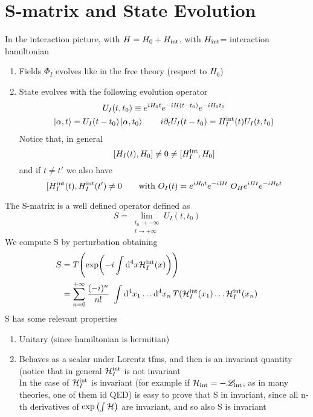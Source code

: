 \section{S-matrix and State Evolution}
In the interaction picture, with $H = H_0 + H_{\textup{int}}$, with $H_{\textup{int}}$= interaction hamiltonian\\
\begin{enumerate}
\item{Fields }$\Phi_I$ evolves like in the free theory (respect to $H_0$)
\item{State evolves with the following evolution operator}
	\begin{gather}
	U_I(t, t_0) \equiv e^{iH_0t} e^{-iH(t-t_0)} e^{-iH_0t_0} \notag \\
	\Ket{\alpha, t} = U_I (t - t_0) \Ket{\alpha, t_0}
	\qquad
	i \partial_t U_I (t-t_0) = H_I^{\textup{int}}(t) U_I(t, t_0) \notag
	\end{gather}
	Notice that, in general
	\[
	[H_I(t), H_0] \ne 0 \ne [H_I^{\textup{int}}, H_0]
	\]
	and if $t \ne t'$ we also have
	\[
	[H_I^{\textup{int}}(t), H_I^{\textup{int}}(t') \ne 0
	\qquad
	\text{with } O_I(t) = e^{iH_0t}e^{-iHt} \ O_H e^{iHt} e^{-iH_0t}
	\]
\end{enumerate}
The S-matrix is a well defined operator defined as
\[
S = \lim_{\substack{t_0 \to -\infty \\ t \to +\infty}} U_I(t, t_0)
\]
We compute S by perturbation obtaining
\[
\begin{split}
S 	& = T \Biggl( \exp \biggl( -i \int \textup{d}^4 x \mathcal{H}_I^{\textup{int}}(x) \biggr) \Biggr) \\
	& = \sum_{n=0}^{+\infty} \frac{(-i)^n}{n!} \ \int \textup{d}^4 x_1 \dots \textup{d}^4 x_n \, T(\mathcal{H}_I^{\textup{int}}(x_1) \dots \mathcal{H}_I^{\textup{int}}(x_n)
\end{split}
\]
S has some relevant properties
\begin{enumerate}
\item{Unitary (since hamiltonian is hermitian)}
\item{Behaves as a scalar under Lorentz tfms, and then is an invariant quantity (notice that in general }$\mathcal{H}_I^{\textup{int}}$ is not invariant\\
	In the case of $\mathcal{H}_I^{\textup{int}}$ is invariant (for example if $\mathcal{H}_{\textup{int}} = -\mathscr{L}_{\textup{int}}$, as in many theories, one of them id QED) is easy to prove that S in invariant, since all n-th derivatives of $\exp{\bigl( \int \mathcal{H}\bigr)}$ are invariant, and so also S is invariant
\end{enumerate}

